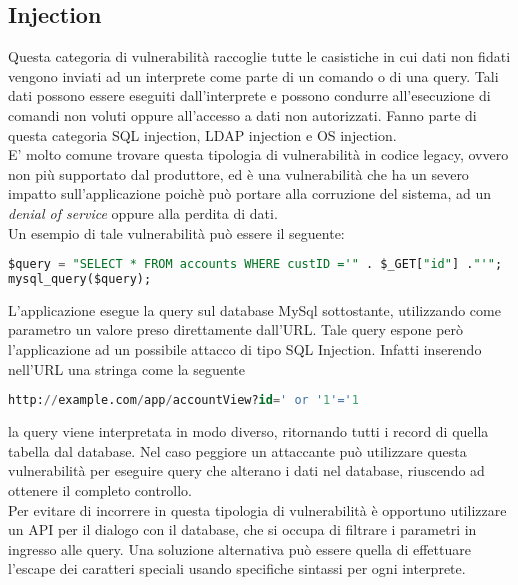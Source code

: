 \subsection{Injection}
Questa categoria di vulnerabilità raccoglie tutte le casistiche in cui dati non fidati vengono inviati ad un interprete come parte di un comando o di una query. Tali dati possono essere eseguiti dall'interprete e possono condurre all'esecuzione di comandi non voluti oppure all'accesso a dati non autorizzati. Fanno parte di questa categoria SQL injection, LDAP injection e OS injection.\\
E' molto comune trovare questa tipologia di vulnerabilità in codice legacy, ovvero non più supportato dal produttore, ed è una vulnerabilità che ha un severo impatto sull'applicazione poichè può portare alla corruzione del sistema, ad un \emph{denial of service} oppure alla perdita di dati.\\
Un esempio di tale vulnerabilità può essere il seguente:
\begin{lstlisting}[language=SQL]
$query = "SELECT * FROM accounts WHERE custID ='" . $_GET["id"] ."'";
mysql_query($query);
\end{lstlisting}

L'applicazione esegue la query sul database MySql sottostante, utilizzando come parametro un valore preso direttamente dall'URL. Tale query espone però l'applicazione ad un possibile attacco di tipo SQL Injection. Infatti inserendo nell'URL una stringa come la seguente

\begin{lstlisting}[language=SQL]
http://example.com/app/accountView?id=' or '1'='1
\end{lstlisting}

la query viene interpretata in modo diverso, ritornando tutti i record di quella tabella dal database. Nel caso peggiore un attaccante può utilizzare questa vulnerabilità per eseguire query che alterano i dati nel database, riuscendo ad ottenere il completo controllo. \\
Per evitare di incorrere in questa tipologia di vulnerabilità è opportuno utilizzare un API per il dialogo con il database, che si occupa di filtrare i parametri in ingresso alle query. Una soluzione alternativa può essere quella di effettuare l'escape dei caratteri speciali usando specifiche sintassi per ogni interprete.

